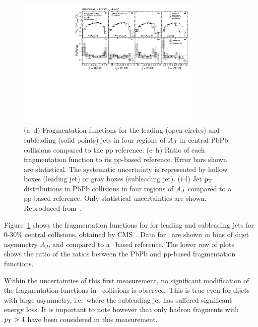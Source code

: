 \begin{figure}[!h]
\begin{center}
\includegraphics[width=0.8\textwidth]{jetfigures/xsi_div_both_effv9_l100s40_0to12_dphi20eta20dr3pt4id1_cwt_ppDiv_gray.pdf}
\caption{(a--d) Fragmentation functions for the leading (open circles) and subleading (solid points) jets in four regions of $A_J$ in central PbPb collisions compared to the pp reference.
(e--h) Ratio of each fragmentation function to its pp-based reference.
Error bars shown are statistical. The systematic uncertainty is
represented by hollow boxes (leading jet) or gray boxes (subleading jet).
(i--l) Jet $\mbox{$p_{\mathrm{T}}$}$ distributions in PbPb collisions in four regions of $A_J$ 
compared to a pp-based reference. Only statistical uncertainties are shown.
Reproduced from~\cite{HIN-11-004}.
}

\label{fig:GR:CMS_jetFF}
\end{center}
\end{figure}
Figure~\ref{fig:GR:CMS_jetFF} shows the fragmentation functions for
for leading and subleading jets for 0-30\% central collisions, obtained
by CMS~\cite{HIN-11-004}. Data for \PbPb\ are shown in 
bins of dijet asymmetry $A_J$, and compared to a \pp\ based reference.
The lower row of plots shows the ratio of the ratios between the PbPb 
and pp-based fragmentation functions.

Within the uncertainties of this first measurement, no significant modification of 
the fragmentation functions in \PbPb\ collisions is observed. This is true even for 
dijets with large asymmetry, i.e.\ where the subleading jet has suffered significant
energy loss. It is important to note however that only hadron fragments with $\mbox{$p_{\mathrm{T}}$} > 4$\GeVc
have been considered in this measurement.

